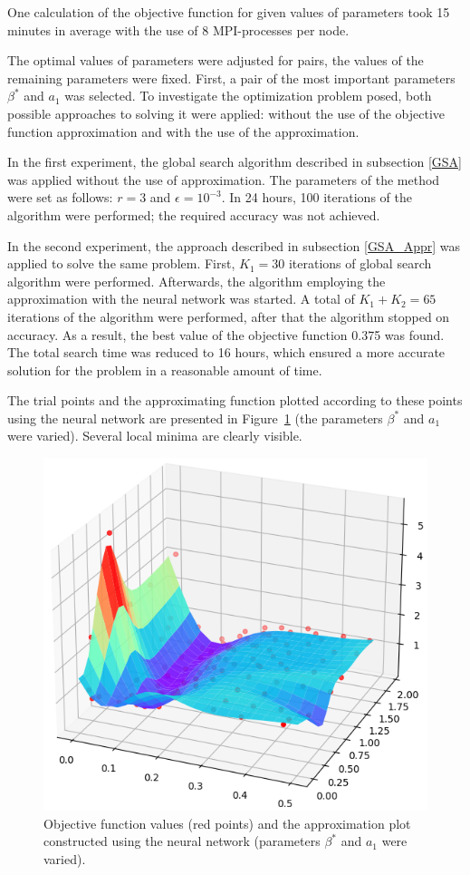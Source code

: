 \documentclass[mathematics,article,submit,pdftex,moreauthors]{Definitions/mdpi}
\begin{document}
One calculation of the objective function for given values of parameters took 15 minutes in average with the use of 8 MPI-processes per node. 

The optimal values of parameters were adjusted for pairs, the values of the remaining parameters were fixed. 
First, a pair of the most important parameters $\beta^*$ and $a_1$ was selected. 
To investigate the optimization problem posed, both possible approaches to solving it were applied: without the use of the objective function approximation  and with the use of the approximation.

In the first experiment, the global search algorithm described in subsection \ref{GSA} was applied without the use of approximation. 
The parameters of the method were set as follows: $r = 3$ and $\epsilon = 10^{-3}$. 
In 24 hours, 100 iterations of the algorithm were performed; the required accuracy was not achieved. 

In the second experiment, the approach described in subsection \ref{GSA_Appr} was applied to solve the same problem.
First, $K_1 = 30$ iterations of global search algorithm were performed. 
Afterwards, the algorithm employing the approximation with the neural network was started. 
A total of $K_1 + K_2 = 65$ iterations of the algorithm were performed, after that the algorithm stopped on accuracy. 
As a result, the best value  of the objective function 0.375 was found. 
The total search time was reduced to 16 hours, which ensured a more accurate solution for the problem in a reasonable amount of time.

The trial points and the approximating function plotted according to these points using the neural network are presented in Figure~\ref{NN_100_point} (the parameters $\beta^*$ and $a_1$ were varied). Several local minima are clearly visible.

\begin{figure}[H]
\begin{center}
\includegraphics[width=10.5 cm]{NN_100_point_.png}
\caption{Objective function values (red points) and the approximation plot constructed using the neural network (parameters $\beta^*$ and $a_1$ were varied).\label{NN_100_point}}
\end{center}
\end{figure}   
\unskip
\end{document}
